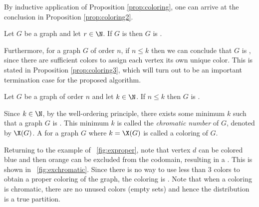 By inductive application of Proposition \ref{prop:coloring}, one can arrive at the conclusion in Proposition
\ref{prop:coloring2}.

\begin{proposition}
  \label{prop:coloring2}
  Let \(G\) be a graph and let \(r\in\N\).  If \(G\) is  then \(G\) is .
\end{proposition}

Furthermore, for a graph \(G\) of order \(n\), if \(n\le k\) then we can conclude that \(G\) is ,
since there are sufficient colors to assign each vertex its own unique color.  This is stated in Proposition
\ref{prop:coloring3}, which will turn out to be an important termination case for the proposed algorithm.

\begin{proposition}
  \label{prop:coloring3}
  Let \(G\) be a graph of order \(n\) and let \(k\in\N\).  If \(n\le k\) then \(G\) is .
\end{proposition}

Since \(k\in\N\), by the well-ordering principle, there exists some minimum \(k\) such that a graph \(G\) is
.  This minimum \(k\) is called the \emph{chromatic number} of \(G\), denoted by \(\X(G)\).  A
 for a graph \(G\) where \(k=\X(G)\) is called a \emph{} coloring of \(G\).

Returning to the example  of \figurename~\ref{fig:exproper}, note that vertex \(d\) can be colored blue
and then orange can be excluded from the codomain, resulting in a .  This is shown in
\figurename~\ref{fig:exchromatic}.  Since there is no way to use less than 3 colors to obtain a proper coloring of
the graph, the coloring is .  Note that when a coloring is chromatic, there are no unused colors
(empty sets) and hence the distribution is a true partition.

